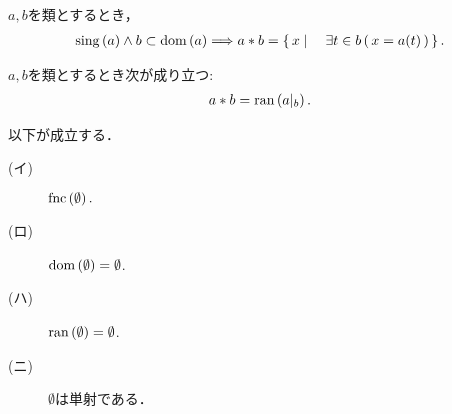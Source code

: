 	\begin{screen}
		\begin{thm}
			$a,b$を類とするとき，
			\begin{align}
				\operatorname*{sing} \left(a\right) \wedge b \subset \operatorname*{dom} \left(a\right) \Longrightarrow
				a \ast b = \left\{\, x \mid \quad \exists t \in b\, (\, x = a(t)\, )\, \right\}.
			\end{align}
		\end{thm}
	\end{screen}
	
	\begin{screen}
		\begin{thm}[像は制限写像の値域に等しい]
			$a,b$を類とするとき次が成り立つ:
			\begin{align}
				a \ast b = \operatorname*{ran} \left(a|_b\right).
			\end{align}
		\end{thm}
	\end{screen}
	
	\begin{screen}
		\begin{thm}[空集合は写像である]
			以下が成立する．
			\begin{description}
				\item[(イ)] $\operatorname*{fnc} \left(\emptyset\right).$
				\item[(ロ)] $\operatorname*{dom} \left(\emptyset\right) = \emptyset$.
				\item[(ハ)] $\operatorname*{ran} \left(\emptyset\right) = \emptyset$.
				\item[(ニ)] $\emptyset$は単射である．
			\end{description}
		\end{thm}
	\end{screen}
	
